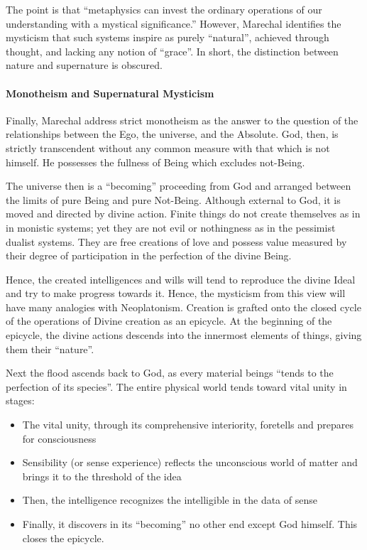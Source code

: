The point is that ``metaphysics can invest the ordinary operations of our understanding with a mystical significance.'' However, Marechal identifies the mysticism that such systems inspire as purely ``natural'', achieved through thought, and lacking any notion of ``grace''. In short, the distinction between nature and supernature is obscured.

\paragraph{Monotheism and Supernatural Mysticism}


Finally, Marechal address strict monotheism as the answer to the question of the relationships between the Ego, the universe, and the Absolute. God, then, is strictly transcendent without any common measure with that which is not himself. He possesses the fullness of Being which excludes not-Being.

The universe then is a ``becoming'' proceeding from God and arranged between the limits of pure Being and pure Not-Being. Although external to God, it is moved and directed by divine action. Finite things do not create themselves as in in monistic systems; yet they are not evil or nothingness as in the pessimist dualist systems. They are free creations of love and possess value measured by their degree of participation in the perfection of the divine Being.

Hence, the created intelligences and wills will tend to reproduce the divine Ideal and try to make progress towards it. Hence, the mysticism from this view will have many analogies with Neoplatonism. Creation is grafted onto the closed cycle of the operations of Divine creation as an epicycle. At the beginning of the epicycle, the divine actions descends into the innermost elements of things, giving them their ``nature''.

Next the flood ascends back to God, as every material beings ``tends to the perfection of its species''. The entire physical world tends toward vital unity in stages:

\begin{itemize}


\item The vital unity, through its comprehensive interiority, foretells and prepares for consciousness

\item Sensibility (or sense experience) reflects the unconscious world of matter and brings it to the threshold of the idea

\item Then, the intelligence recognizes the intelligible in the data of sense

\item Finally, it discovers in its ``becoming'' no other end except God himself. This closes the epicycle.
\end{itemize}


